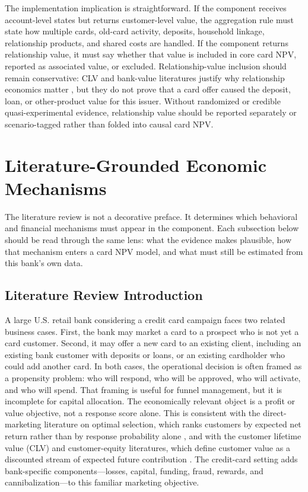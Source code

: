 \documentclass[11pt]{article}
\newcommand{\1}{\mathbf{1}}
\begin{document}
The implementation implication is straightforward. If the component receives
account-level states but returns customer-level value, the aggregation rule must
state how multiple cards, old-card activity, deposits, household linkage,
relationship products, and shared costs are handled. If the component returns
relationship value, it must say whether that value is included in core card NPV,
reported as associated value, or excluded. Relationship-value inclusion should
remain conservative: CLV and bank-value literatures justify why relationship
economics matter \citep{berger1998clv,rust2004return,venkatesan2004clv,
egan2022bankvalue}, but they do not prove that a card offer caused the deposit,
loan, or other-product value for this issuer. Without randomized or credible
quasi-experimental evidence, relationship value should be reported separately
or scenario-tagged rather than folded into causal card NPV.


\section{Literature-Grounded Economic Mechanisms}
\label{sec:v4-literature-mechanisms}

The literature review is not a decorative preface.  It determines which
behavioral and financial mechanisms must appear in the component.  Each
subsection below should be read through the same lens: what the evidence makes
plausible, how that mechanism enters a card NPV model, and what must still be
estimated from this bank's own data.

\subsection{Literature Review Introduction}

A large U.S. retail bank considering a credit card campaign faces two related
business cases. First, the bank may market a card to a prospect who is not yet a
card customer. Second, it may offer a new card to an existing client, including
an existing bank customer with deposits or loans, or an existing cardholder who
could add another card. In both cases, the operational decision is often framed
as a propensity problem: who will respond, who will be approved, who will
activate, and who will spend. That framing is useful for funnel management, but
it is incomplete for capital allocation. The economically relevant object is a
profit or value objective, not a response score alone. This is consistent with
the direct-marketing literature on optimal selection, which ranks customers by
expected net return rather than by response probability alone
\citep{bult1995directmail}, and with the customer lifetime value (CLV) and
customer-equity literatures, which define customer value as a discounted stream
of expected future contribution \citep{berger1998clv,rust2004return,venkatesan2004clv}.
The credit-card setting adds bank-specific components---losses, capital,
funding, fraud, rewards, and cannibalization---to this familiar marketing
objective.
\end{document}

